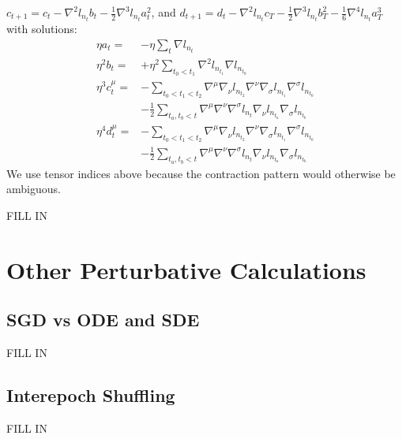 \documentclass{article}
\begin{document}
            $
                c_{t+1} = c_t -\nabla^2 l_{n_t} b_t 
                              -\frac{1}{2} \nabla^3 l_{n_t} a_t^2
            $, and
            $
                d_{t+1} = d_t -             \nabla^2 l_{n_t} c_T
                              - \frac{1}{2} \nabla^3 l_{n_t} b_T^2 
                              - \frac{1}{6} \nabla^4 l_{n_t} a_T^3 
            $
            with solutions:
            \begin{align*}
                \eta a_t = &-\eta \sum_{t} \nabla l_{n_t}
                \\ 
                \eta^2 b_t = &+\eta^2 \sum_{t_0 < t_1} \nabla^2 l_{n_{t_1}} \nabla l_{n_{t_0}}
                \\
                \eta^3 c_t^\mu =
                    &-\sum_{t_0 < t_1 < t_2} 
                        \nabla^\mu \nabla_\nu l_{n_{t_2}}
                        \nabla^\nu \nabla_\sigma l_{n_{t_1}} \nabla^\sigma l_{n_{t_0}} \\
                    &-\frac{1}{2}
                        \sum_{t_a, t_b < t}
                        \nabla^\mu \nabla^\nu \nabla^\sigma l_{n_t}
                        \nabla_\nu l_{n_{t_a}}
                        \nabla_\sigma l_{n_{t_b}}
                \\
                \eta^4 d_t^\mu =
                    &-\sum_{t_0 < t_1 < t_2} 
                        \nabla^\mu \nabla_\nu l_{n_{t_2}}
                        \nabla^\nu \nabla_\sigma l_{n_{t_1}} \nabla^\sigma l_{n_{t_0}} \\
                    &-\frac{1}{2}
                        \sum_{t_a, t_b < t}
                        \nabla^\mu \nabla^\nu \nabla^\sigma l_{n_t}
                        \nabla_\nu l_{n_{t_a}}
                        \nabla_\sigma l_{n_{t_b}}
            \end{align*}
            We use tensor indices above because the contraction pattern would
            otherwise be ambiguous.

            {\color{moor} FILL IN}


\section{Other Perturbative Calculations} \label{sect:calculations}
    \subsection{SGD vs ODE and SDE}
        {\color{moor} FILL IN}
    \subsection{Interepoch Shuffling}
        {\color{moor} FILL IN}
\end{document}
